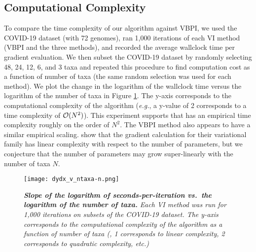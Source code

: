 \subsection{Computational Complexity}

To compare the time complexity of our algorithm against VBPI, we used the COVID-19 dataset (with 72 genomes), ran 1,000 iterations of each VI method (VBPI and the three \model methods), and recorded the average wallclock time per gradient evaluation. We then subset the COVID-19 dataset by randomly selecting 48, 24, 12, 6, and 3 taxa and repeated this procedure to find computation cost as a function of number of taxa (the same random selection was used for each method).
%
We plot the change in the logarithm of the wallclock time versus the logarithm of the number of taxa in Figure \ref{fig:computation}. The y-axis corresponds to the computational complexity of the algorithm (\textit{e.g.}, a y-value of 2 corresponds to a time complexity of $\mathcal{O}(N^2)$).
%
This experiment supports that \model has an empirical time complexity roughly on the order of $N^2$. The VBPI method also appears to have a similar empirical scaling. \citet{Zhang:2024} show that the gradient calculation for their variational family has linear complexity with respect to the number of parameters, but we conjecture that the number of parameters may grow super-linearly with the number of taxa $N$.

\begin{figure}[ht]
    \centering
    \texttt{[image: dydx\_v\_ntaxa-n.png]}
    \caption{{\bf \emph{Slope of the logarithm of seconds-per-iteration vs.\ the logarithm of the number of taxa.}} \emph{Each VI method was run for 1,000 iterations on subsets of the COVID-19 dataset. The y-axis corresponds to the computational complexity of the algorithm as a function of number of taxa (\ie, 1 corresponds to linear complexity, 2 corresponds to quadratic complexity, etc.)}}
    \label{fig:computation}
\end{figure}